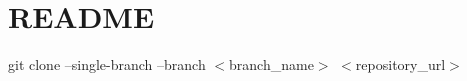 \chapter{README }
\hypertarget{md__r_e_a_d_m_e}{}\label{md__r_e_a_d_m_e}
git clone --single-\/branch --branch $<$branch\+\_\+name$>$ $<$repository\+\_\+url$>$ 